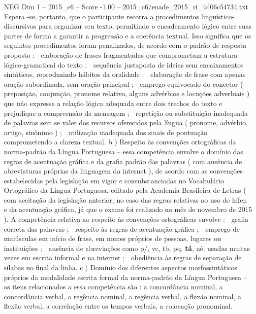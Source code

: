 \begin{textsample}{NEG Dim 1 – 2015\_c6 – Score -1.00 – 2015\_c6/enade\_2015\_ri\_4d06c54734.txt}
Espera -se, portanto, que o participante recorra a procedimentos linguístico-discursivos para organizar seu texto, permitindo o encadeamento lógico entre suas partes de forma a garantir a progressão e a coerência textual.
Isso significa que os seguintes procedimentos foram penalizados, de acordo com o padrão de resposta proposto :  elaboração de frases fragmentadas que comprometam a estrutura lógico-gramatical do texto ;  sequência justaposta de ideias sem encaixamentos sintáticos, reproduzindo hábitos da oralidade ;  elaboração de frase com apenas oração subordinada, sem oração principal ;  emprego equivocado do conector ( preposição, conjunção, pronome relativo, alguns advérbios e locuções adverbiais ) que não expresse a relação lógica adequada entre dois trechos do texto e prejudique a compreensão da mensagem ;  repetição ou substituição inadequada de palavras sem se valer dos recursos oferecidos pela língua ( pronome, advérbio, artigo, sinônimo ) ;  utilização inadequada dos sinais de pontuação comprometendo a clareza textual. b ) Respeito às convenções ortográficas da norma-padrão da Língua Portuguesa – essa competência envolve o domínio das regras de acentuação gráfica e da grafia padrão das palavras ( com ausência de abreviaturas próprias da linguagem da internet ), de acordo com as convenções estabelecidas pela legislação em vigor e consubstanciadas no Vocabulário Ortográfico da Língua Portuguesa, editado pela Academia Brasileira de Letras ( com aceitação da legislação anterior, no caso das regras relativas ao uso do hífen e da acentuação gráfica, já que o exame foi realizado no mês de novembro de 2015 ).
A competência relativa ao respeito às convenções ortográficas envolve :  grafia correta das palavras ;  respeito às regras de acentuação gráfica ;  emprego de maiúsculas em início de frase, em nomes próprios de pessoas, lugares ou instituições ;  ausência de abreviações como p/, vc, tb, pq, \textbf{tá}, né, usadas muitas vezes em escrita informal e na internet ;  obediência às regras de separação de sílabas no final da linha. c ) Domínio dos diferentes aspectos morfossintáticos próprios da modalidade escrita formal da norma-padrão da Língua Portuguesa – os itens relacionados a essa competência são : a concordância nominal, a concordância verbal, a regência nominal, a regência verbal, a flexão nominal, a flexão verbal, a correlação entre os tempos verbais, a colocação pronominal.

\end{textsample}
